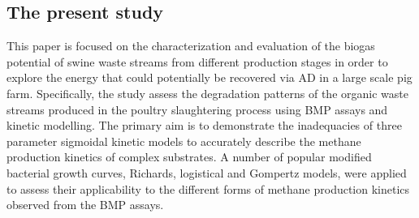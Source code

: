 \subsection{The present study}
This paper is focused on the characterization and evaluation of the biogas potential of swine waste streams from different production stages in order to explore the energy that could potentially be recovered via AD in a large scale pig farm. Specifically, the study assess the degradation patterns of the organic waste streams produced in the poultry slaughtering process using BMP assays and kinetic modelling. The primary aim is to demonstrate the inadequacies of three parameter sigmoidal kinetic models to accurately describe the methane production kinetics of complex substrates. A number of popular modified bacterial growth curves, Richards, logistical and Gompertz models, were applied to assess their applicability to the different forms of methane production kinetics observed from the BMP assays.